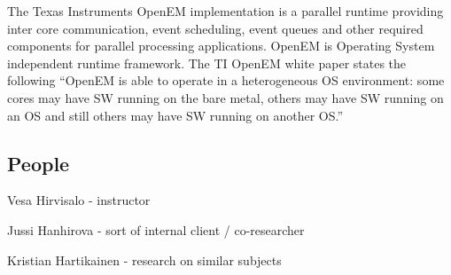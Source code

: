 The Texas Instruments OpenEM implementation is a parallel runtime providing inter core communication, event scheduling, event queues and other required components for parallel processing applications. OpenEM is Operating System independent runtime framework. The TI OpenEM white paper states the following ``OpenEM is able to operate in a heterogeneous OS environment: some cores may have SW running on the bare metal, others may have SW running on an OS and still others may have SW running on another OS.''

\subsection{People}
Vesa Hirvisalo - instructor

Jussi Hanhirova - sort of internal client / co-researcher

Kristian Hartikainen - research on similar subjects